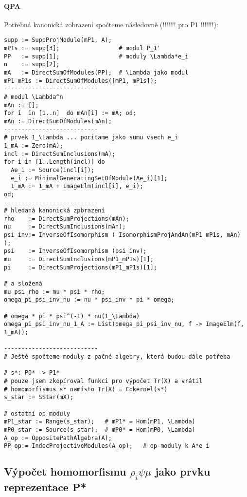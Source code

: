 \documentclass[7pt]{article}
\begin{document}
     \paragraph{QPA} Potřebná kanonická zobrazení spočteme následovně (!!!!!!! pro P1 !!!!!!!):
\begin{verbatim}
supp := SuppProjModule(mP1, A);
mP1s := supp[3];                 # modul P_1'
PP   := supp[1];                 # moduly \Lambda*e_i
n    := supp[2];        
mA   := DirectSumOfModules(PP);  # \Lambda jako modul
mP1_mP1s := DirectSumOfModules([mP1, mP1s]);
---------------------------
# modul \Lambda^n
mAn := [];
for i  in [1..n]  do mAn[i] := mA; od;
mAn := DirectSumOfModules(mAn);
---------------------------
# prvek 1_\Lambda ... pocitame jako sumu vsech e_i
1_mA := Zero(mA);
incl := DirectSumInclusions(mA);
for i in [1..Length(incl)] do
  Ae_i := Source(incl[i]);
  e_i := MinimalGeneratingSetOfModule(Ae_i)[1];
  1_mA := 1_mA + ImageElm(incl[i], e_i);
od;
---------------------------
# hledaná kanonická zpbrazení
rho    := DirectSumProjections(mAn);
nu     := DirectSumInclusions(mAn);
psi_inv:= InverseOfIsomorphism ( IsomorphismProjAndAn(mP1_mP1s, mAn) );
psi    := InverseOfIsomorphism (psi_inv);
mu     := DirectSumInclusions(mP1_mP1s)[1];
pi     := DirectSumProjections(mP1_mP1s)[1];

# a složená
mu_psi_rho := mu * psi * rho;
omega_pi_psi_inv_nu := nu * psi_inv * pi * omega;
  
# omega * pi * psi^(-1) * nu(1_\Lambda)
omega_pi_psi_inv_nu_1_A := List(omega_pi_psi_inv_nu, f -> ImageElm(f, 1_mA));

---------------------------
# Ještě spočteme moduly z pačné algebry, která budou dále potřeba

# s*: P0* -> P1*
# pouze jsem zkopíroval funkci pro výpočet Tr(X) a vrátil 
# homomorfismus s* namísto Tr(X) = Cokernel(s*)
s_star := SStar(mX);     

# ostatní op-moduly
mP1_star := Range(s_star);   # mP1* = Hom(mP1, \Lambda)
mP0_star := Source(s_star);  # mP0* = Hom(mP0, \Lambda)
A_op := OppositePathAlgebra(A);
PP_op:= IndecProjectiveModules(A_op);   # op-moduly k A*e_i
\end{verbatim}


    \subsection{Výpočet homomorfismu $\rho_i\psi\mu$ jako prvku reprezentace P*} 
\end{document}
